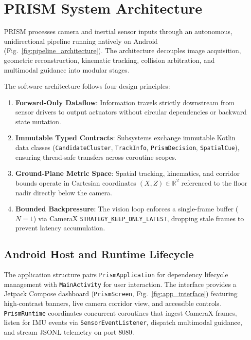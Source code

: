 \section{PRISM System Architecture}
\label{sec:architecture}

PRISM processes camera and inertial sensor inputs through an autonomous, unidirectional pipeline running natively on Android (Fig.~\ref{fig:pipeline_architecture}). The architecture decouples image acquisition, geometric reconstruction, kinematic tracking, collision arbitration, and multimodal guidance into modular stages.



The software architecture follows four design principles:
\begin{enumerate}
    \item \textbf{Forward-Only Dataflow}: Information travels strictly downstream from sensor drivers to output actuators without circular dependencies or backward state mutation.
    \item \textbf{Immutable Typed Contracts}: Subsystems exchange immutable Kotlin data classes (\texttt{CandidateCluster}, \texttt{TrackInfo}, \texttt{PrismDecision}, \texttt{SpatialCue}), ensuring thread-safe transfers across coroutine scopes.
    \item \textbf{Ground-Plane Metric Space}: Spatial tracking, kinematics, and corridor bounds operate in Cartesian coordinates $(X, Z) \in \mathbb{R}^2$ referenced to the floor nadir directly below the camera.
    \item \textbf{Bounded Backpressure}: The vision loop enforces a single-frame buffer ($N = 1$) via CameraX \texttt{STRATEGY\_KEEP\_ONLY\_LATEST}, dropping stale frames to prevent latency accumulation.
\end{enumerate}



\subsection{Android Host and Runtime Lifecycle}
The application structure pairs \texttt{PrismApplication} for dependency lifecycle management with \texttt{MainActivity} for user interaction. The interface provides a Jetpack Compose dashboard (\texttt{PrismScreen}, Fig.~\ref{fig:app_interface}) featuring high-contrast banners, live camera corridor view, and accessible controls. \texttt{PrismRuntime} coordinates concurrent coroutines that ingest CameraX frames, listen for IMU events via \texttt{SensorEventListener}, dispatch multimodal guidance, and stream JSONL telemetry on port 8080.

